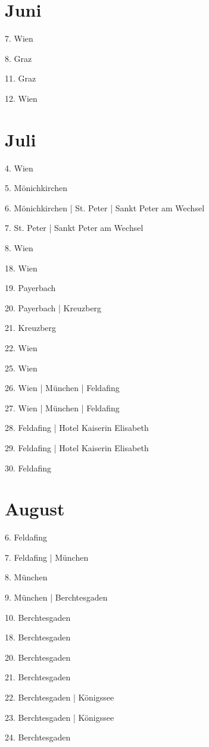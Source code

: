 \documentclass[twoside=false,titlepage=false,open=any, parskip=never, fontsize=10pt, headings=small, chapterprefix=false, appendixprefix=false, DIV=15]{scrbook}
\begin{document}
\begin{multicols}{3}
            \section*{Juni}
            7. Wien\par
            8. Graz\par
            11. Graz\par
            12. Wien\par
            \section*{Juli}
            4. Wien\par
            5. Mönichkirchen\par
            6. Mönichkirchen | St. Peter | Sankt Peter am Wechsel\par
            7. St. Peter | Sankt Peter am Wechsel\par
            8. Wien\par
            18. Wien\par
            19. Payerbach\par
            20. Payerbach | Kreuzberg\par
            21. Kreuzberg\par
            22. Wien\par
            25. Wien\par
            26. Wien | München | Feldafing\par
            27. Wien | München | Feldafing\par
            28. Feldafing | Hotel Kaiserin Elisabeth\par
            29. Feldafing | Hotel Kaiserin Elisabeth\par
            30. Feldafing\par
            \section*{August}
            6. Feldafing\par
            7. Feldafing | München\par
            8. München\par
            9. München | Berchtesgaden\par
            10. Berchtesgaden\par
            18. Berchtesgaden\par
            20. Berchtesgaden\par
            21. Berchtesgaden\par
            22. Berchtesgaden | Königssee\par
            23. Berchtesgaden | Königssee\par
            24. Berchtesgaden\par

\end{multicols}
\end{document}
